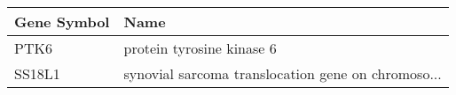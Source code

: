 \begin{tabular}{ll}
\toprule
Gene Symbol &                                               Name \\
\midrule
       PTK6 &                          protein tyrosine kinase 6 \\
     SS18L1 & synovial sarcoma translocation gene on chromoso... \\
\bottomrule
\end{tabular}

